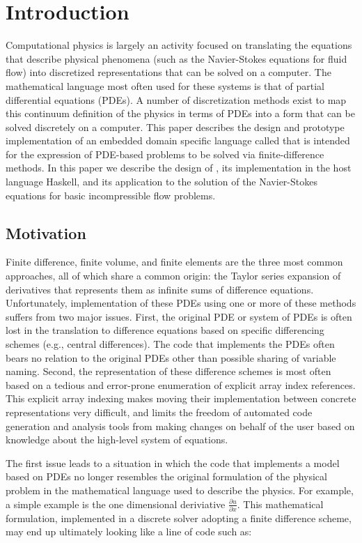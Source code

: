 \section{Introduction}

Computational physics is largely an activity focused on translating
the equations that describe physical phenomena (such as the
Navier-Stokes equations for fluid flow) into discretized
representations that can be solved on a computer.  The mathematical
language most often used for these systems is that of partial
differential equations (PDEs).  A number of discretization methods
exist to map this continuum definition of the physics in terms of PDEs
into a form that can be solved discretely on a computer.  This paper
describes the design and prototype implementation of an embedded
domain specific language called \FIDDLE that is intended for the
expression of PDE-based problems to be solved via finite-difference
methods.  In this paper we describe the design of \FIDDLE, its
implementation in the host language Haskell, and its application to
the solution of the Navier-Stokes equations for basic incompressible
flow problems.

\subsection{Motivation}

Finite difference, finite volume, and finite elements are the three
most common approaches, all of which share a common origin: the Taylor
series expansion of derivatives that represents them as infinite sums
of difference equations.  Unfortunately, implementation of these PDEs
using one or more of these methods suffers from two major issues.
First, the original PDE or system of PDEs is often lost in the
translation to difference equations based on specific differencing
schemes (e.g., central differences).  The code that implements the
PDEs often bears no relation to the original PDEs other than possible
sharing of variable naming.  Second, the representation of these
difference schemes is most often based on a tedious and error-prone
enumeration of explicit array index references.  This explicit array
indexing makes moving their implementation between concrete
representations very difficult, and limits the freedom of automated
code generation and analysis tools from making changes on behalf of
the user based on knowledge about the high-level system of equations.

The first issue leads to a situation in which the code that implements
a model based on PDEs no longer resembles the original formulation of
the physical problem in the mathematical language used to describe the
physics.  For example, a simple example is the one dimensional
deriviative $\frac{\partial u}{\partial x}$.  This mathematical
formulation, implemented in a discrete solver adopting a finite
difference scheme, may end up ultimately looking like a line of code
such as:

